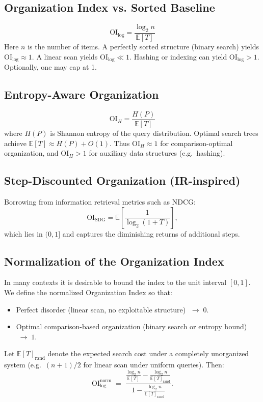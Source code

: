 \documentclass[11pt]{article}
\begin{document}
\subsection{Organization Index vs. Sorted Baseline}
\[
\mathrm{OI}_{\log} = \frac{\log_2 n}{\mathbb{E}[T]}
\]
Here $n$ is the number of items. A perfectly sorted structure (binary search)
yields $\mathrm{OI}_{\log} \approx 1$. A linear scan yields
$\mathrm{OI}_{\log} \ll 1$. Hashing or indexing can yield $\mathrm{OI}_{\log} >
1$. Optionally, one may cap at 1.

\subsection{Entropy-Aware Organization}
\[
\mathrm{OI}_H = \frac{H(P)}{\mathbb{E}[T]}
\]
where $H(P)$ is Shannon entropy of the query distribution. Optimal search trees
achieve $\mathbb{E}[T] \approx H(P)+O(1)$. Thus $\mathrm{OI}_H \approx 1$ for
comparison-optimal organization, and $\mathrm{OI}_H > 1$ for auxiliary data
structures (e.g.\ hashing).

\subsection{Step-Discounted Organization (IR-inspired)}
Borrowing from information retrieval metrics such as NDCG:
\[
\mathrm{OI}_{\text{SDG}} = \mathbb{E}\!\left[\frac{1}{\log_2(1+T)}\right],
\]
which lies in $(0,1]$ and captures the diminishing returns of additional steps.

\subsection{Normalization of the Organization Index}
In many contexts it is desirable to bound the index to the unit interval $[0,1]$.
We define the normalized Organization Index so that:
\begin{itemize}
  \item Perfect disorder (linear scan, no exploitable structure) $\;\to\; 0$.
  \item Optimal comparison-based organization (binary search or entropy bound) $\;\to\; 1$.
\end{itemize}

Let $\mathbb{E}[T]_{\mathrm{rand}}$ denote the expected search cost under a
completely unorganized system (e.g.\ $(n+1)/2$ for linear scan under uniform
queries). Then:
\[
\mathrm{OI}^{\mathrm{norm}}_{\log} \;=\;
\frac{\tfrac{\log_2 n}{\mathbb{E}[T]} - \tfrac{\log_2 n}{\mathbb{E}[T]_{\mathrm{rand}}}}
{1 - \tfrac{\log_2 n}{\mathbb{E}[T]_{\mathrm{rand}}}}.
\]
\end{document}
